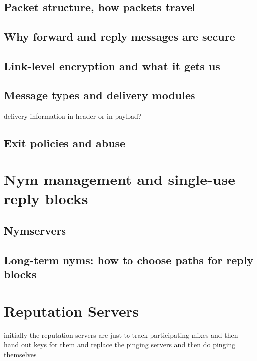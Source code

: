 \documentclass{llncs}
\begin{document}
\subsection{Packet structure, how packets travel}

\subsection{Why forward and reply messages are secure}

\subsection{Link-level encryption and what it gets us}

\subsection{Message types and delivery modules}

delivery information in header or in payload?

\subsection{Exit policies and abuse}


\section{Nym management and single-use reply blocks}

\subsection{Nymservers}

\subsection{Long-term nyms: how to choose paths for reply blocks}


\section{Reputation Servers}

initially the reputation servers are just to track participating
mixes
and then hand out keys for them
and replace the pinging servers
and then do pinging themselves
\end{document}
